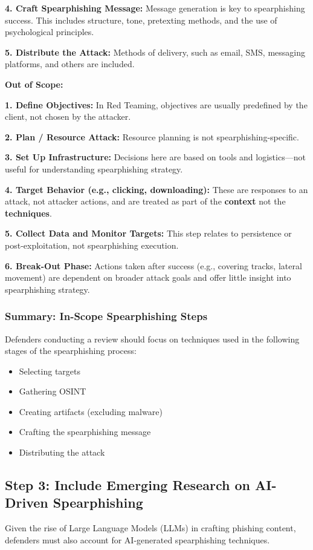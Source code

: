 \textbf{4. Craft Spearphishing Message:}
Message generation is key to spearphishing success. This includes structure, tone, pretexting methods, and the use of psychological principles.

\textbf{5. Distribute the Attack:}
Methods of delivery, such as email, SMS, messaging platforms, and others are included.

\textbf{Out of Scope:}

\textbf{1. Define Objectives:}
In Red Teaming, objectives are usually predefined by the client, not chosen by the attacker.

\textbf{2. Plan / Resource Attack:}
Resource planning is not spearphishing-specific.

\textbf{3. Set Up Infrastructure:}
Decisions here are based on tools and logistics—not useful for understanding spearphishing strategy.

\textbf{4. Target Behavior (e.g., clicking, downloading):}
These are responses to an attack, not attacker actions, and are treated as part of the \textbf{context} not the \textbf{techniques}.

\textbf{5. Collect Data and Monitor Targets:}
This step relates to persistence or post-exploitation, not spearphishing execution.

\textbf{6. Break-Out Phase:}
Actions taken after success (e.g., covering tracks, lateral movement) are dependent on broader attack goals and offer little insight into spearphishing strategy.

\subsubsection{Summary: In-Scope Spearphishing Steps}

Defenders conducting a review should focus on techniques used in the following stages of the spearphishing process:

\begin{itemize}
\item Selecting targets
\item Gathering OSINT
\item Creating artifacts (excluding malware)
\item Crafting the spearphishing message
\item Distributing the attack
\end{itemize}

\subsection{Step 3: Include Emerging Research on AI-Driven Spearphishing}
Given the rise of Large Language Models (LLMs) in crafting phishing content, defenders must also account for AI-generated spearphishing techniques.

